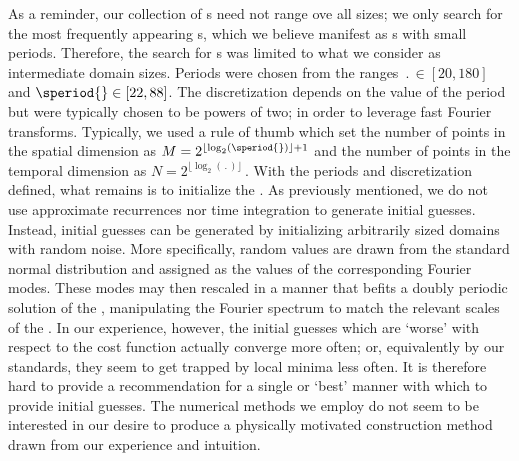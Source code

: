 As a reminder, our collection of {\po}s need not range ove all sizes;
we only search for the most frequently appearing {\fpo}s,
which we believe manifest as {\po}s with small periods. Therefore,
the search for {\po}s was limited to what we consider as intermediate domain sizes.
Periods were chosen from the ranges
$\period{}\in [20, 180]$ and $\speriod{} \in [22, 88]$. The discretization depends on
the value of the period but were typically chosen to be powers of two; in order
to leverage fast Fourier transforms. %
Typically, we used a rule of thumb which set the number of points in the
spatial dimension as $M = 2^{\lfloor\log_2(\speriod{})\rfloor + 1}$
and the number of points in the temporal dimension as
$
N = 2^{\lfloor\log_2(\period{})\rfloor}\,.
$
With the periods and discretization defined, what remains is to
initialize the {\spt} {\Fcs}.
As previously mentioned, we do not use
approximate recurrences nor time integration
to generate initial guesses.
Instead, initial guesses can be generated by initializing arbitrarily
sized domains with random noise.
More specifically, random values are drawn from the standard normal distribution
and assigned as the values of the corresponding Fourier modes.
These modes may then rescaled in a manner that befits a
doubly periodic solution of the {\KSe},
manipulating the Fourier spectrum to match the relevant scales of the \KSe.
In our experience, however, the initial guesses which are `worse' with respect
to the cost function actually converge more often; or, equivalently by our standards,
they seem to get trapped by local minima less often.
It is therefore hard to provide a recommendation for a single or `best'
manner with which to provide initial guesses. The
numerical methods we employ do not seem to be interested in our desire
to produce a physically motivated construction method
drawn from our experience and intuition.


